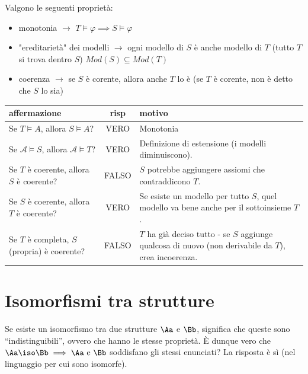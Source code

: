 \documentclass[a4paper,11pt]{report}
\begin{document}
Valgono le seguenti proprietà:
\begin{itemize}
    \item monotonia \( \longrightarrow \) \( T\vDash \varphi \implies S \vDash \varphi \)

    \item "ereditarietà" dei modelli \( \longrightarrow \) ogni modello di \( S \) è anche modello di \( T \) (tutto \( T \) si trova dentro \( S \))
        \subitem \( Mod(S) \subseteq Mod(T) \)

    \item coerenza \( \longrightarrow \) se \( S \) è corente, allora anche \( T \) lo è
        \subitem (se \( T \) è corente, non è detto che \( S \) lo sia)
\end{itemize}

\begin{table}[h!]
\centering
\renewcommand{\arraystretch}{1.3} 
\begin{tabular}{|l|c|p{7cm}|}
\hline
\textbf{affermazione} & \textbf{risp} & \textbf{motivo} \\ \hline
Se $T \models A$, allora $S \models A$? & VERO & Monotonia \\ \hline
Se $\mathcal{A} \models S$, allora $\mathcal{A} \models T$? & VERO & Definizione di estensione (i modelli diminuiscono). \\ \hline
Se $T$ è coerente, allora $S$ è coerente? & FALSO & $S$ potrebbe aggiungere assiomi che contraddicono $T$. \\ \hline
Se $S$ è coerente, allora $T$ è coerente? & VERO & Se esiste un modello per tutto $S$, quel modello va bene anche per il sottoinsieme $T$. \\ \hline
Se $T$ è completa, $S$ (propria) è coerente? & FALSO & $T$ ha già deciso tutto - se $S$ aggiunge qualcosa di nuovo (non derivabile da $T$), crea incoerenza. \\ \hline
\end{tabular}
\end{table}




\section{Isomorfismi tra strutture}
Se esiste un isomorfismo tra due strutture \( \Aa \) e \( \Bb \), significa che queste sono ``indistinguibili'', ovvero che hanno le stesse proprietà. È dunque vero che \( \Aa \iso \Bb \implies \Aa \text{ e } \Bb \) soddisfano gli stessi enunciati? La risposta è sì (nel linguaggio per cui sono isomorfe).
\end{document}
